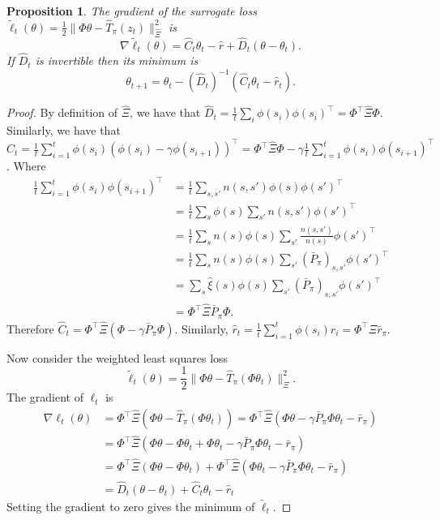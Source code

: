 \documentclass{article} %
\newtheorem{proposition}[theorem]{Proposition}
\theoremstyle{definition}
\begin{document}
\begin{proposition}\label{thm:bert-surr}
    The gradient of the surrogate loss $\tilde{\ell}_t(\theta)= \frac{1}{2}\|\Phi \theta - \hat{T}_{\pi}(z_t)\|^2_{\hat{\Xi}}$ is
    \[
        \nabla \tilde{\ell}_t(\theta) = \hat{C}_t\theta_t -\hat{r} + \hat{D}_t(\theta - \theta_t).
    \]
    If $\hat{D}_t$ is invertible then its minimum is
    \[
        \theta_{t+1} = \theta_t - (\hat{D}_t)^{-1}(\hat{C}_t \theta_t -\hat{r}_t).
    \]
\end{proposition}
\begin{proof}
    By definition of $\hat{\Xi}$, we have that $\hat{D}_t = \frac{1}{t}\sum_i \phi(s_i)\phi(s_i)^\top = \Phi^\top \hat{\Xi} \Phi$.
    Similarly, we have that $\hat{C}_t = \frac{1}{t}\sum_{i=1}^t \phi(s_i)(\phi(s_i) - \gamma \phi(s_{i+1}))^\top = \Phi^\top \hat{\Xi} \Phi - \gamma\frac{1}{t}\sum_{i=1}^t\phi(s_i)\phi(s_{i+1})^\top$.
    Where
    \begin{align}
        \frac{1}{t}\sum_{i=1}^t\phi(s_i)\phi(s_{i+1})^\top &= \frac{1}{t} \sum_{s,s'}n(s,s')\phi(s)\phi(s')^\top\\
        &= \frac{1}{t} \sum_{s}\phi(s)\sum_{s'} n(s,s') \phi(s')^\top\\
        &= \frac{1}{t} \sum_{s}n(s)\phi(s)\sum_{s'} \frac{n(s,s')}{n(s)} \phi(s')^\top\\
        &=  \frac{1}{t} \sum_{s}n(s)\phi(s)\sum_{s'} (\bar{P}_{\pi})_{s,s'}\phi(s')^\top\\
        &= \sum_s \hat{\xi}(s)\phi(s)\sum_{s'} (\bar{P}_{\pi})_{s,s'}\phi(s')^\top\\
        &= \Phi^\top \hat{\Xi}\bar{P}_\pi \Phi. 
    \end{align}
    Therefore $\hat{C}_t = \Phi^\top \hat{\Xi}(\Phi -\gamma \bar{P}_\pi \Phi)$.
    Similarly, $\hat{r}_t = \frac{1}{t}\sum_{i=1}^t \phi(s_i)r_i = \Phi^\top\Xi \bar{r}_\pi$.

    Now consider the weighted least squares loss
    \[
    \tilde{\ell}_t(\theta) = \frac{1}{2}\|\Phi \theta - \hat{T}_\pi(\Phi \theta_t)\|^2_{\hat{\Xi}}.
    \]
    The gradient of $\ell_t$ is
    \begin{align}
    \nabla \ell_t(\theta) &= \Phi^\top\hat{\Xi}(\Phi \theta - \hat{T}_{\pi}(\Phi \theta_t)) = \Phi^\top\hat{\Xi}(\Phi \theta - \gamma \bar{P}_{\pi}\Phi \theta_t  - \bar{r}_\pi)\\
    &=\Phi^\top\hat{\Xi}(\Phi \theta -\Phi \theta_t +\Phi \theta_t - \gamma \bar{P}_{\pi}\Phi \theta_t  - \bar{r}_\pi) \\ 
    &= \Phi^\top\hat{\Xi}(\Phi \theta -\Phi \theta_t) + \Phi^\top\hat{\Xi}(\Phi \theta_t - \gamma \bar{P}_{\pi}\Phi \theta_t  - \bar{r}_\pi)\\
    &= \hat{D}_t(\theta -\theta_t) + \hat{C}_t\theta_t -\hat{r}_t
   \end{align}
Setting the gradient to zero gives the minimum of $\tilde{\ell}_t$. 
\end{proof}
\end{document}
